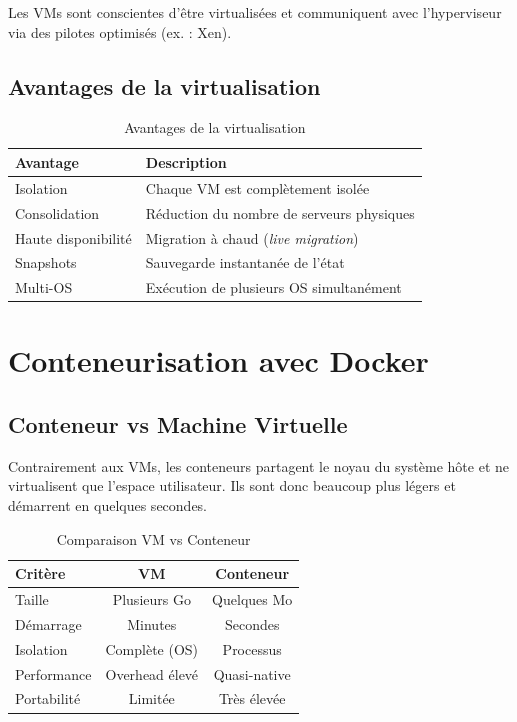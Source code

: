 \documentclass[12pt,a4paper]{article}
\begin{document}
Les VMs sont conscientes d'être virtualisées et communiquent avec l'hyperviseur via des pilotes optimisés (ex. : Xen).

\subsection{Avantages de la virtualisation}

\begin{table}[H]
\centering
\begin{tabular}{@{}lp{8cm}@{}}
\toprule
\textbf{Avantage} & \textbf{Description} \\
\midrule
Isolation & Chaque VM est complètement isolée \\
Consolidation & Réduction du nombre de serveurs physiques \\
Haute disponibilité & Migration à chaud (\textit{live migration}) \\
Snapshots & Sauvegarde instantanée de l'état \\
Multi-OS & Exécution de plusieurs OS simultanément \\
\bottomrule
\end{tabular}
\caption{Avantages de la virtualisation}
\end{table}

\section{Conteneurisation avec Docker}

\subsection{Conteneur vs Machine Virtuelle}

Contrairement aux VMs, les conteneurs partagent le noyau du système hôte et ne virtualisent que l'espace utilisateur. Ils sont donc beaucoup plus légers et démarrent en quelques secondes.

\begin{table}[H]
\centering
\begin{tabular}{@{}lcc@{}}
\toprule
\textbf{Critère} & \textbf{VM} & \textbf{Conteneur} \\
\midrule
Taille & Plusieurs Go & Quelques Mo \\
Démarrage & Minutes & Secondes \\
Isolation & Complète (OS) & Processus \\
Performance & Overhead élevé & Quasi-native \\
Portabilité & Limitée & Très élevée \\
\bottomrule
\end{tabular}
\caption{Comparaison VM vs Conteneur}
\end{table}
\end{document}
